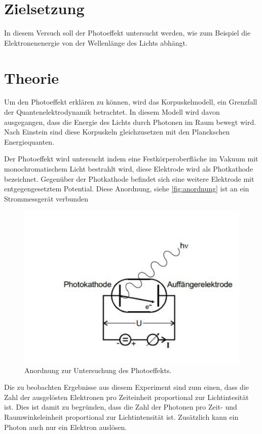 \section{Zielsetzung}
In diesem Versuch soll der Photoeffekt untersucht werden, wie zum Beispiel die Elektronenenergie von der Wellenlänge des Lichts abhängt.

\section{Theorie}
\label{sec:Theorie}
Um den Photoeffekt erklären zu können, wird das Korpuskelmodell, ein Grenzfall der Quantenelektrodynamik betrachtet.
In diesem Modell wird davon ausgegangen, dass die Energie des Lichts durch Photonen im Raum bewegt wird.
Nach Einstein sind diese Korpuskeln gleichzusetzen mit den Planckschen Energiequanten.

\noindent
Der Photoeffekt wird untersucht indem eine Festkörperoberfläche im Vakuum mit monochromatischem Licht bestrahlt wird, diese Elektrode wird als Photkathode bezeichnet.
Gegenüber der Photkathode befindet sich eine weitere Elektrode mit entgegengesetztem Potential.
Diese Anordnung, siehe \autoref{fig:anordnung} ist an ein Strommessgerät verbunden

\begin{figure}
    \centering
    \includegraphics[width =\textwidth]{content/anordnung.pdf}
    \caption{Anordnung zur Untersuchung des Photoeffekts.\cite{anleitung}}
    \label{fig:anordnung}
\end{figure}
\noindent
Die zu beobachten Ergebnisse aus diesem Experiment sind zum einen, dass die Zahl der ausgelösten Elektronen pro Zeiteinheit proportional zur Lichtintesität ist.
Dies ist damit zu begründen, dass die Zahl der Photonen pro Zeit- und Raumwinkeleinheit proportional zur Lichtintensität ist.
Zusätzlich kann ein Photon auch nur ein Elektron auslösen.


